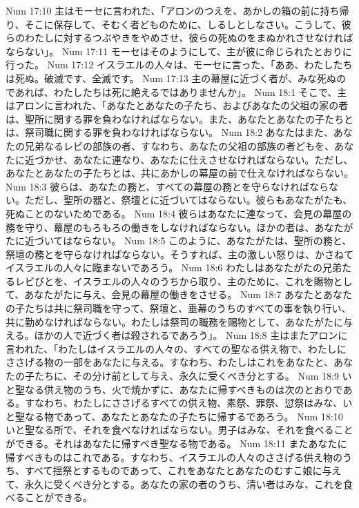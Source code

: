 Num 17:10  主はモーセに言われた、「アロンのつえを、あかしの箱の前に持ち帰り、そこに保存して、そむく者どものために、しるしとしなさい。こうして、彼らのわたしに対するつぶやきをやめさせ、彼らの死ぬのをまぬかれさせなければならない」。
Num 17:11  モーセはそのようにして、主が彼に命じられたとおりに行った。
Num 17:12  イスラエルの人々は、モーセに言った、「ああ、わたしたちは死ぬ。破滅です、全滅です。
Num 17:13  主の幕屋に近づく者が、みな死ぬのであれば、わたしたちは死に絶えるではありませんか」。
Num 18:1  そこで、主はアロンに言われた、「あなたとあなたの子たち、およびあなたの父祖の家の者は、聖所に関する罪を負わなければならない。また、あなたとあなたの子たちとは、祭司職に関する罪を負わなければならない。
Num 18:2  あなたはまた、あなたの兄弟なるレビの部族の者、すなわち、あなたの父祖の部族の者どもを、あなたに近づかせ、あなたに連なり、あなたに仕えさせなければならない。ただし、あなたとあなたの子たちとは、共にあかしの幕屋の前で仕えなければならない。
Num 18:3  彼らは、あなたの務と、すべての幕屋の務とを守らなければならない。ただし、聖所の器と、祭壇とに近づいてはならない。彼らもあなたがたも、死ぬことのないためである。
Num 18:4  彼らはあなたに連なって、会見の幕屋の務を守り、幕屋のもろもろの働きをしなければならない。ほかの者は、あなたがたに近づいてはならない。
Num 18:5  このように、あなたがたは、聖所の務と、祭壇の務とを守らなければならない。そうすれば、主の激しい怒りは、かさねてイスラエルの人々に臨まないであろう。
Num 18:6  わたしはあなたがたの兄弟たるレビびとを、イスラエルの人々のうちから取り、主のために、これを賜物として、あなたがたに与え、会見の幕屋の働きをさせる。
Num 18:7  あなたとあなたの子たちは共に祭司職を守って、祭壇と、垂幕のうちのすべての事を執り行い、共に勤めなければならない。わたしは祭司の職務を賜物として、あなたがたに与える。ほかの人で近づく者は殺されるであろう」。
Num 18:8  主はまたアロンに言われた、「わたしはイスラエルの人々の、すべての聖なる供え物で、わたしにささげる物の一部をあなたに与える。すなわち、わたしはこれをあなたと、あなたの子たちに、その分け前として与え、永久に受くべき分とする。
Num 18:9  いと聖なる供え物のうち、火で焼かずに、あなたに帰すべきものは次のとおりである。すなわち、わたしにささげるすべての供え物、素祭、罪祭、愆祭はみな、いと聖なる物であって、あなたとあなたの子たちに帰するであろう。
Num 18:10  いと聖なる所で、それを食べなければならない。男子はみな、それを食べることができる。それはあなたに帰すべき聖なる物である。
Num 18:11  またあなたに帰すべきものはこれである。すなわち、イスラエルの人々のささげる供え物のうち、すべて揺祭とするものであって、これをあなたとあなたのむすこ娘に与えて、永久に受くべき分とする。あなたの家の者のうち、清い者はみな、これを食べることができる。
